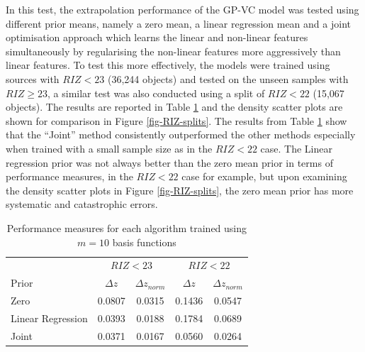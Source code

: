 \documentclass[useAMS,usenatbib,fleqn]{mn2e}
\begin{document}
In this test, the extrapolation performance of the GP-VC model was tested using different prior means, namely a zero mean, a linear regression mean and a joint optimisation approach which learns the linear and non-linear features simultaneously by regularising the non-linear features more aggressively than linear features. To test this more effectively,  the models were trained using sources with $RIZ<23$ (36,244 objects) and tested on the unseen samples with $RIZ\ge23$, a similar test was also conducted using a split of $RIZ<22$ (15,067 objects). The results are reported in Table \ref{table-RIZ-splits} and the density scatter plots are shown for comparison in Figure \ref{fig-RIZ-splits}. The results from Table \ref{table-RIZ-splits} show that the ``Joint'' method consistently outperformed the other methods especially when trained with a small sample size as in the $RIZ<22$ case. The Linear regression prior was not always better than the zero mean prior in terms of performance measures, in the $RIZ<22$ case for example, but upon examining the density scatter plots in Figure \ref{fig-RIZ-splits}, the zero mean prior has more systematic and catastrophic errors.

 \begin{table}
\caption{Performance measures for each algorithm trained using $m=10$ basis functions}
\begin{center}
  \begin{tabular}{| l | c | c | c | c | }
  								& 	\multicolumn{2}{|c|}{$RIZ<23$}		& 	\multicolumn{2}{c}{$RIZ<22$} \\ \cline{2-5}
     	Prior						&	$\Delta z$	&	$\Delta z_{norm}$	&	$\Delta z$	&	$\Delta z_{norm}$	\\	\hline
	Zero						&	0.0807		&	0.0315				&	0.1436		&	0.0547					\\
	Linear Regression		&	0.0393		&	0.0188				&	0.1784		&	0.0689					\\
	Joint						&	0.0371		&	0.0167				&	0.0560		&	0.0264					\\	\hline
  \end{tabular}
  \label{table-RIZ-splits}
\end{center}
\end{table}
\end{document}
